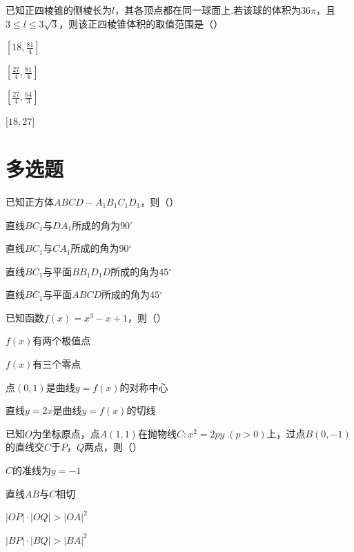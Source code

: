 \documentclass[fontset=founder]{ucedubook}
\begin{document}
\begin{ti}
已知正四棱锥的侧棱长为$l$，其各顶点都在同一球面上.若该球的体积为$36\pi$，且$3 \leq l \leq 3\sqrt{3}$，则该正四棱锥体积的取值范围是（\qquad）

\begin{choices}
  \item $\left\lbrack 18,\frac{81}{4} \right\rbrack$
  \item $\left\lbrack \frac{27}{4},\frac{81}{4} \right\rbrack$
  \item $\left\lbrack \frac{27}{4},\frac{64}{3} \right\rbrack$
  \item $\lbrack 18,27\rbrack$
\end{choices}
\end{ti}


\newpageb
\section{多选题}

\begin{ti}
已知正方体$ABCD - A_{1}B_{1}C_{1}D_{1}$，则（\qquad）

\begin{choices}
  \item 直线$BC_{1}$与$DA_{1}$所成的角为$90{^\circ}$
  \item 直线$BC_{1}$与$CA_{1}$所成的角为$90{^\circ}$
  \item 直线$BC_{1}$与平面$BB_{1}D_{1}D$所成的角为$45{^\circ}$
  \item 直线$BC_{1}$与平面$ABCD$所成的角为$45{^\circ}$
\end{choices}
\end{ti}


\begin{ti}
已知函数$f(x) = x^{3} - x + 1$，则（\qquad）

\begin{choices}
  \item $f(x)$有两个极值点
  \item $f(x)$有三个零点
  \item 点$(0,1)$是曲线$y = f(x)$的对称中心
  \item 直线$y = 2x$是曲线$y = f(x)$的切线
\end{choices}
\end{ti}


\begin{ti}
已知$O$为坐标原点，点$A(1,1)$在抛物线$C:x^{2} = 2py\;(p > 0)$上，过点$B(0, - 1)$的直线交$C$于$P$，$Q$两点，则（\qquad）

\begin{choices}
  \item $C$的准线为$y = - 1$
  \item 直线$AB$与$C$相切
  \item $|OP| \cdot |OQ| > |OA|^{2}$
  \item $|BP| \cdot |BQ| > |BA|^{2}$
\end{choices}
\end{ti}
\end{document}
